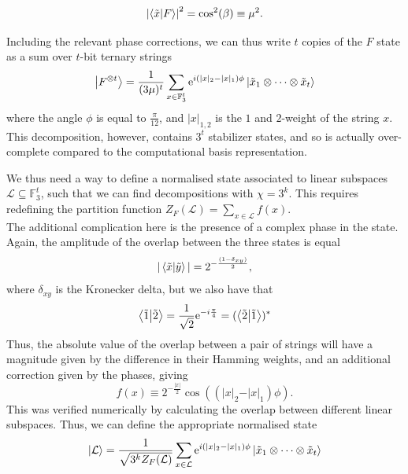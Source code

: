 \documentclass{standalone}
\begin{document}
\begin{equation}
\left|\braket{\tilde{x}}{F}\right|^{2} = \cos^{2}(\beta)\equiv\mu^{2}.
\end{equation}
\par
Including the relevant phase corrections, we can thus write $t$ copies of the $F$ state as a sum over $t$-bit ternary strings
\begin{equation}
    \ket{F^{\otimes t}} = \frac{1}{(3\mu)^{t}}\sum_{x\in\mathbb{F}_{3}^{t}}\mathrm{e}^{i(\vert x\vert_{2}-\vert x\vert_{1})\phi}\ket{\tilde{x}_{1}\otimes\cdots\otimes\tilde{x}_{t}}
\end{equation}
where the angle $\phi$ is equal to $\frac{\pi}{12}$, and $\vert x\vert_{1,2}$ is the $1$ and $2$-weight of the string $x$.\\
This decomposition, however, contains $3^{t}$ stabilizer states, and so is actually over-complete compared to the computational basis representation. 
\par
We thus need a way to define a normalised state associated to linear subspaces $\mathcal{L}\subseteq\mathbb{F}_{3}^{t}$, such that we can find decompositions with $\chi=3^{k}$. This requires redefining the partition function $Z_{F}(\mathcal{L})=\sum_{x\in\mathcal{L}}f(x)$.\\
The additional complication here is the presence of a complex phase in the state. Again, the amplitude of the overlap between the three states is equal
\[\vert\braket{\tilde{x}}{\tilde{y}}\vert = 2^{-\frac{(1-\delta_{xy})}{2}},\]
where $\delta_{xy}$ is the Kronecker delta, but we also have that 
\[
\braket{\tilde{1}}{\tilde{2}}=\frac{1}{\sqrt{2}} 
\mathrm{e}^{-i\frac{\pi}{4}} 
= (\braket{\tilde{2}}{\tilde{1}})^*
\]
Thus, the absolute value of the overlap between a pair of strings will have a magnitude given by the difference in their Hamming weights, and an additional correction given by the phases, giving
\begin{equation}
    f(x)\equiv 2^{-\frac{\vert x\vert}{2}}\cos((\vert x\vert_{2}-\vert x\vert_{1})\phi).
\end{equation}
This was verified numerically by calculating the overlap between different linear subspaces. Thus, we can define the appropriate normalised state
\begin{equation}
    \ket{\mathcal{L}}=\frac{1}{\sqrt{3^{k}Z_{F}(\mathcal{L})}}\sum_{x\in\mathcal{L}}
    \mathrm{e}^{i(\vert x\vert_{2}-\vert x\vert_{1})\phi}\ket{\tilde{x}_{1}\otimes\cdots\otimes\tilde{x}_{t}}
\end{equation}
\par
\end{document}
